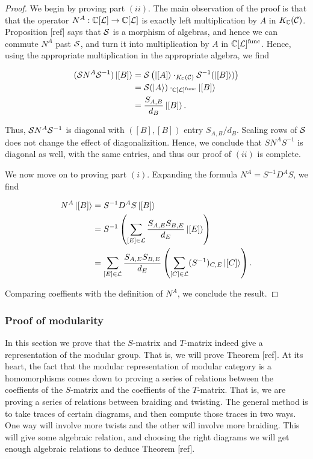 \begin{proof} We begin by proving part $(ii)$. The main observation of the proof is that that the operator $N^{A}:{\mathbb C}[{\mathcal L}]\to{\mathbb C}[{\mathcal L}]$ is exactly left multiplication by $A$ in $K_{{\mathbb C}}({\mathcal C})$. Proposition [ref] says that ${\mathcal S}$ is a morphism of algebras, and hence we can commute $N^{A}$ past ${\mathcal S}$, and turn it into multiplication by $A$ in ${\mathbb C}[{\mathcal L}]^{\text{func}}$. Hence, using the appropriate multiplication in the appropriate algebra, we find

\begin{align*}
({\mathcal S} N^{A}{\mathcal S}^{-1}) \ket{[B]} & = {\mathcal S} \left(\ket{[A]} \cdot_{K_{{\mathbb C}}({\mathcal C})} {\mathcal S}^{-1}(\ket{[B]})\right)\\
& = {\mathcal S}(\ket{A}) \cdot_{{\mathbb C}[{\mathcal L}]^{\text{func}}} \ket{[B]}\\
& = \frac{S_{A,B}}{d_B}\ket{[B]}.
\end{align*}

Thus, ${\mathcal S} N^{A}{\mathcal S}^{-1}$ is diagonal with $([B],[B])$ entry $S_{A,B}/d_B$. Scaling rows of ${\mathcal S}$ does not change the effect of diagonalizition. Hence, we conclude that $S N^{A}S^{-1}$ is diagonal as well, with the same entries, and thus our proof of $(ii)$ is complete.

We now move on to proving part $(i)$. Expanding the formula $N^{A}=S^{-1}D^{A}S$, we find

\begin{align*}
N^{A}\ket{[B]} &= S^{-1}D^{A}S \ket{[B]}\\
&=S^{-1}\left(\sum_{[E]\in{\mathcal L}}\frac{S_{A,E} S_{B,E}}{d_E}\ket{[E]}\right)\\
&=\sum_{[E]\in{\mathcal L}}\frac{S_{A,E} S_{B,E}}{d_E}\left(\sum_{[C]\in {\mathcal L}}(S^{-1})_{C,E}\ket{[C]}\right).\\
\end{align*}

Comparing coeffients with the definition of $N^{A}$, we conclude the result.

\end{proof}


\subsubsection{Proof of modularity}

In this section we prove that the $S$-matrix and $T$-matrix indeed give a representation of the modular group. That is, we will prove Theorem [ref]. At its heart, the fact that the modular representation of modular category is a homomorphisms comes down to proving a series of relations between the coeffients of the $S$-matrix and the coeffients of the $T$-matrix. That is, we are proving a series of relations between braiding and twisting. The general method is to take traces of certain diagrams, and then compute those traces in two ways. One way will involve more twists and the other will involve more braiding. This will give some algebraic relation, and choosing the right diagrams we will get enough algebraic relations to deduce Theorem [ref].


